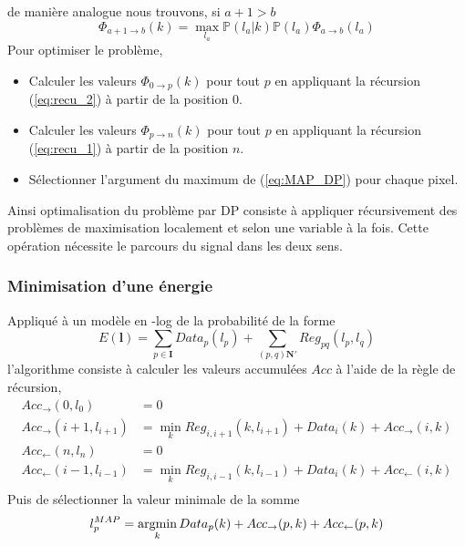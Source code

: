\documentclass[../main/These_Mathias_Paget.tex]{subfiles}
\begin{document}
de manière analogue nous trouvons, si ${a{+}1}>b$
\begin{equation}
\Phi_{a{+}1 \rightarrow b}(k)= \max_{l_a}\mathbb{P}(l_a|k)\mathbb{P}(l_a)\Phi_{a \rightarrow b}(l_a)
\label{eq:recu_2}
\end{equation}
Pour optimiser le problème,
\begin{itemize}
\item Calculer les valeurs $\Phi_{0 \rightarrow p}(k)$ pour tout $p$ en appliquant la récursion (\ref{eq:recu_2}) à partir de la position $0$.
\item Calculer les valeurs $\Phi_{p \rightarrow n}(k)$ pour tout $p$ en appliquant la récursion (\ref{eq:recu_1}) à partir de la position $n$. 
\item Sélectionner l'argument du maximum de (\ref{eq:MAP_DP}) pour chaque pixel.
\end{itemize}
Ainsi optimalisation du problème par DP consiste à appliquer récursivement des problèmes de maximisation localement et selon une variable à la fois. Cette opération nécessite le parcours du signal dans les deux sens.

\subsubsection{Minimisation d'une énergie}
\label{sss:min_DP}

Appliqué à un modèle en -log de la probabilité de la forme
\begin{equation}
E(\boldsymbol{l}) = \sum_{p \in \boldsymbol{I}}{Data_p(l_p)} + \sum_{(p,q)\boldsymbol{N'}}{Reg_{pq}(l_p,l_q)}
\end{equation}
l’algorithme consiste à calculer les valeurs accumulées $Acc$ à l'aide de la règle de récursion,
\begin{equation}
\begin{aligned}
Acc_{\rightarrow}(0,l_{0}) &= 0 \\
Acc_{\rightarrow}(i{+}1,l_{i{+}1}) &= \min_{k}{Reg_{i,i{+}1}(k,l_{i{+}1}) + Data_i(k) + Acc_{\rightarrow}(i,k)} \\
Acc_{\leftarrow}(n,l_{n}) &= 0 \\
Acc_{\leftarrow}(i{-}1,l_{i{-}1}) &= \min_{k}{Reg_{i,i{-}1}(k,l_{i{-}1}) + Data_i(k) + Acc_{\leftarrow}(i,k)} \\
\end{aligned}
\end{equation}
Puis de sélectionner la valeur minimale de la somme
\begin{equation}
l^{MAP}_p = \argmin_{k}{ Data_p(k) + Acc_{\rightarrow}(p,k) + Acc_{\leftarrow}(p,k)}
\end{equation}
\end{document}
